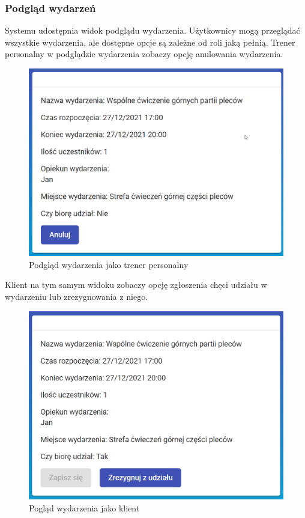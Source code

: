 \documentclass[a4paper,twoside,12pt]{book}
\begin{document}
\subsubsection{Podgląd wydarzeń}
Systemu udostępnia widok podglądu wydarzenia. Użytkownicy mogą przeglądać wszystkie wydarzenia, ale dostępne opcje są zależne od roli jaką pełnią. Trener personalny w podglądzie wydarzenia zobaczy opcję anulowania wydarzenia.
\begin{figure}[h!]
	\centering
	\includegraphics[width=0.7\linewidth]{../zrzuty_ekranu/dzialanie/wydarzenia/trener_podlad_wydarzenie}
	\caption{Podgląd wydarzenia jako trener personalny}
	\label{fig:trenerpodladwydarzenie}
\end{figure}
\FloatBarrier
Klient na tym samym widoku zobaczy opcję zgłoszenia chęci udziału w wydarzeniu lub zrezygnowania z niego.
\begin{figure}[h!]
	\centering
	\includegraphics[width=1\linewidth]{../zrzuty_ekranu/dzialanie/wydarzenia/klient_podlad_wydarzenia}
	\caption{Pogląd wydarzenia jako klient}
	\label{fig:klientpodladwydarzenia}
\end{figure}
\FloatBarrier
\end{document}
